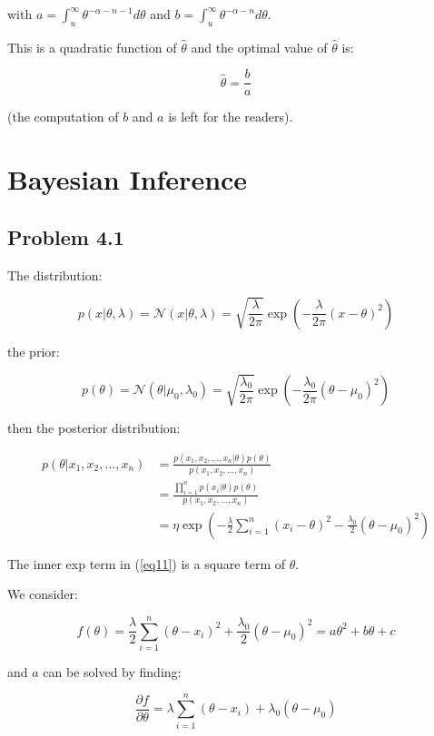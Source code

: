 \documentclass{article}
\begin{document}
with $a=\int_{u}^{\infty}\theta^{-\alpha-n-1}d\theta$ and $b=\int_{u}^{\infty}\theta^{-\alpha-n}d\theta$.

This is a quadratic function of $\hat{\theta}$ and the optimal value of $\hat{\theta}$ is:

$$
\hat{\theta} = \frac{b}{a}
$$

(the computation of $b$ and $a$ is left for the readers).

\section{Bayesian Inference}

\subsection{Problem 4.1}

The distribution:

$$
p(x|\theta,\lambda) = \mathcal{N}(x|\theta,\lambda)=\sqrt{\frac{\lambda}{2\pi}}\exp(-\frac{\lambda}{2\pi}(x-\theta)^2)
$$

the prior:

$$
p(\theta) = \mathcal{N}(\theta|\mu_0,\lambda_0)=\sqrt{\frac{\lambda_0}{2\pi}}\exp(-\frac{\lambda_0}{2\pi}(\theta-\mu_0)^2)
$$

then the posterior distribution:

\begin{equation}\label{eq11}
    \begin{aligned}
        p(\theta|x_1,x_2,...,x_n) &= \frac{p(x_1,x_2,...,x_n|\theta)p(\theta)}{p(x_1,x_2,...,x_n)}\\
        &= \frac{\prod_{i=1}^np(x_i|\theta)p(\theta)}{p(x_1,x_2,...,x_n)} \\
        &=\eta \exp(-\frac{\lambda}{2}\sum_{i=1}^n(x_i-\theta)^2-\frac{\lambda_0}{2}(\theta-\mu_0)^2)
    \end{aligned}
\end{equation}

The inner exp term in (\ref{eq11}) is a square term of $\theta$.

We consider:

$$
f(\theta) = \frac{\lambda}{2}\sum_{i=1}^n(\theta-x_i)^2+\frac{\lambda_0}{2}(\theta-\mu_0)^2=a\theta^2+b\theta+c
$$

and $a$ can be solved by finding:

$$
\frac{\partial f}{\partial \theta} = \lambda\sum_{i=1}^n(\theta-x_i)+\lambda_0(\theta-\mu_0)
$$
\end{document}
